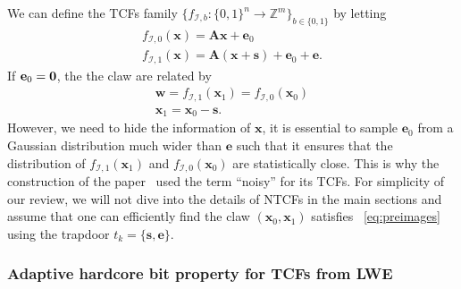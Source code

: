 \documentclass[cryptography,review,submit,pdftex,moreauthors,amsmath,amssymb,aps,strict]{Definitions/mdpi}
\begin{document}
We can define the TCFs family  $\{f_{\mathcal{I},b}:\{0,1\}^n\to\mathbb{Z}^{m}\}_{b\in\{0,1\}}$ by letting 
\begin{align}
    f_{\mathcal{I},0}(\mathbf{x})=\mathbf{A}\mathbf{x}+\mathbf{e}_0\\
   f_{\mathcal{I},1}(\mathbf{x})=\mathbf{A}(\mathbf{x}+\mathbf{s})+\mathbf{e}_0+\mathbf{e}.
\end{align} 
If $\mathbf{e}_0 =\bf{0}$, the the claw are related by 
\begin{align}
    \mathbf{w}=f_{\mathcal{I},1}(\mathbf{x}_1)=f_{\mathcal{I},0}(\mathbf{x}_0)\\
    \mathbf{x}_1=\mathbf{x}_0-\mathbf{s}.\label{eq:preimages}
\end{align}
However, we need to hide the information of $\mathbf{x}$, it is essential to sample $\mathbf{e}_0$ from a Gaussian distribution much wider than $\mathbf{e}$ such that it ensures that the distribution of $f_{\mathcal{I},1}(\mathbf{x}_1)$ and $f_{\mathcal{I},0}(\mathbf{x}_0)$ are statistically close. This is why the construction of the paper~\cite{Brakerski18_Interactiveproofofquantumness} used the term ``noisy'' for its TCFs. For simplicity of our review, we will not dive into the details of NTCFs in the main sections and assume that one can efficiently find the claw $(\mathbf{x}_0,\mathbf{x}_1)$ satisfies ~\eqref{eq:preimages} using the trapdoor $t_k=\{\mathbf{s},\mathbf{e}\}$.



\subsubsection{Adaptive hardcore bit property for TCFs from LWE}
\end{document}

